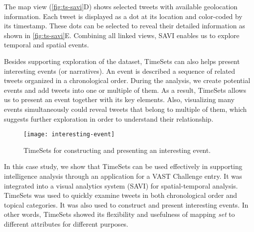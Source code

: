The map view (\autoref{fig:ts-savi}D) shows selected tweets with available geolocation information. Each tweet is displayed as a dot at its location and color-coded by its timestamp. These dots can be selected to reveal their detailed information as shown in \autoref{fig:ts-savi}E. Combining all linked views, SAVI enables us to explore temporal and spatial events.

Besides supporting exploration of the dataset, TimeSets can also helps present interesting events (or narratives). An event is described a sequence of related tweets organized in a chronological order. During the analysis, we create potential events and add tweets into one or multiple of them. As a result, TimeSets allows us to present an event together with its key elements. Also, visualizing many events simultaneously could reveal tweets that belong to multiple of them, which suggests further exploration in order to understand their relationship.

\begin{figure}[!htb]
	\centering
	\texttt{[image: interesting-event]}
	\caption{TimeSets for constructing and presenting an interesting event.}
	\label{fig:ts-interesting-event}
\end{figure}

In this case study, we show that TimeSets can be used effectively in supporting intelligence analysis through an application for a VAST Challenge entry. It was integrated into a visual analytics system (SAVI) for spatial-temporal analysis. TimeSets was used to quickly examine tweets in both chronological order and topical categories. It was also used to construct and present interesting events. In other words, TimeSets showed its flexibility and usefulness of  mapping \emph{set} to different attributes for different purposes.